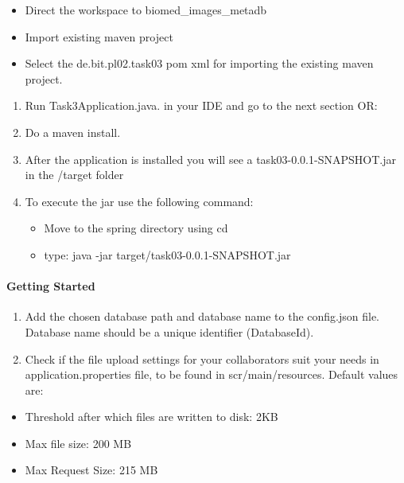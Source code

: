 \begin{itemize}
\tightlist
\item
  Direct the workspace to biomed\_images\_metadb
\item
  Import existing maven project
\item
  Select the de.bit.pl02.task03 pom xml for importing the existing maven
  project.
\end{itemize}

\begin{enumerate}
\def\labelenumi{\arabic{enumi}.}
\setcounter{enumi}{2}
\tightlist
\item
  Run Task3Application.java. in your IDE and go to the next section OR:
\item
  Do a maven install.
\item
  After the application is installed you will see a
  task03-0.0.1-SNAPSHOT.jar in the /target folder
\item
  To execute the jar use the following command:

  \begin{itemize}
  \tightlist
  \item
    Move to the spring directory using cd
  \item
    type: java -jar target/task03-0.0.1-SNAPSHOT.jar
  \end{itemize}
\end{enumerate}

\hypertarget{getting-started}{%
\paragraph{Getting Started}\label{getting-started}}

\begin{enumerate}
\def\labelenumi{\arabic{enumi}.}
\tightlist
\item
  Add the chosen database path and database name to the config.json
  file. Database name should be a unique identifier (DatabaseId).
\item
  Check if the file upload settings for your collaborators suit your
  needs in application.properties file, to be found in
  scr/main/resources. Default values are:
\end{enumerate}

\begin{itemize}
\tightlist
\item
  Threshold after which files are written to disk: 2KB
\item
  Max file size: 200 MB
\item
  Max Request Size: 215 MB
\end{itemize}

